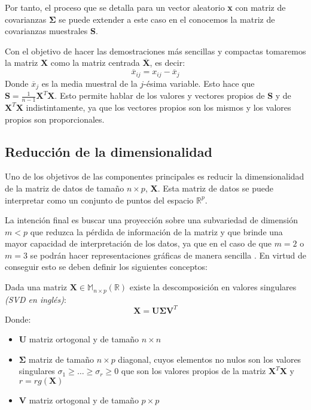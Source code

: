 \noindent Por tanto, el proceso que se detalla para un vector aleatorio \textbf{x} con matriz de covarianzas $\mathbf{\Sigma}$ se puede extender a este caso en el conocemos la matriz de covarianzas muestrales \textbf{S}.

\noindent Con el objetivo de hacer las demostraciones más sencillas y compactas tomaremos la matriz $\textbf{X}$ como la matriz centrada $\overline{\textbf{X}}$, es decir: 
\begin{equation}
\overline{x}_{ij}=x_{ij}-\overline{x}_j
\end{equation}
Donde $\overline{x}_j$ es la media muestral de la $j$-ésima variable. Esto hace que $\textbf{S}=\frac{1}{n-1}\textbf{X}^T\textbf{X}$. Esto permite hablar de los valores y vectores propios de \textbf{S} y de $\textbf{X}^T \textbf{X}$ indistintamente, ya que los vectores propios son los mismos y los valores propios son proporcionales. 

\subsection{Reducción de la dimensionalidad}

\noindent Uno de los objetivos de las componentes principales es reducir la dimensionalidad de la matriz de datos de tamaño $n\times p$, \textbf{X}. Esta matriz de datos se puede interpretar como un conjunto de puntos del espacio $\mathbb{R}^p$. 

\noindent La intención final es buscar una proyección sobre una subvariedad de dimensión $m<p$ que reduzca la pérdida de información de la matriz y que brinde una mayor capacidad de interpretación de los datos, ya que en el caso de que $m=2$ o $m=3$ se podrán hacer representaciones gráficas de manera sencilla . En virtud de conseguir esto se deben definir los siguientes conceptos:

\begin{defi}
Dada una matriz $\textbf{X}\in  \mathbb{M}_{n\times p}(\mathbb{R})$ existe la descomposición en valores singulares \textit{(SVD en inglés)}:
\begin{equation}
\textbf{X}=\textbf{U}\mathbf{\Sigma}\textbf{V}^T
\end{equation}
Donde:
\begin{itemize}
\item \textbf{U} matriz ortogonal y de tamaño $n \times n$
\item $\mathbf{\Sigma}$ matriz de tamaño $n \times p $ diagonal, cuyos elementos no nulos son los valores singulares $\sigma_1\geq\ldots\geq \sigma_r\geq 0$ que son los valores propios de la matriz $\textbf{X}^T\textbf{X}$ y $r=rg(\textbf{X})$
\item \textbf{V} matriz ortogonal y de tamaño $p \times p$
\end{itemize}
\end{defi}

